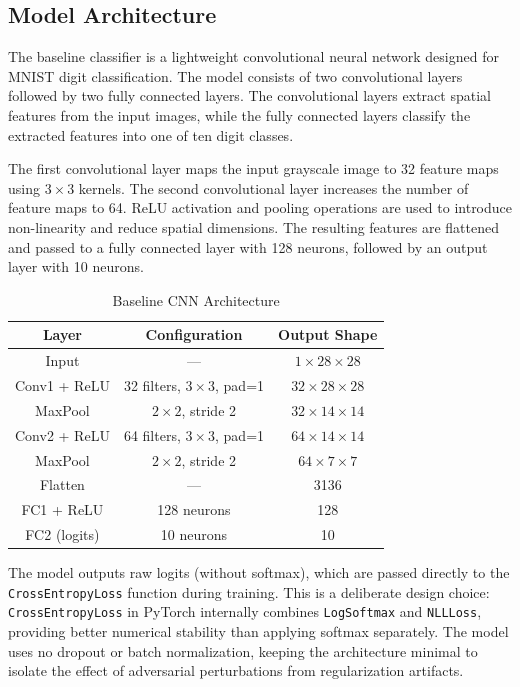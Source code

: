 \documentclass[conference]{IEEEtran}
\begin{document}
\subsection{Model Architecture}

The baseline classifier is a lightweight convolutional neural network designed for MNIST digit classification. The model consists of two convolutional layers followed by two fully connected layers. The convolutional layers extract spatial features from the input images, while the fully connected layers classify the extracted features into one of ten digit classes.

The first convolutional layer maps the input grayscale image to 32 feature maps using $3 \times 3$ kernels. The second convolutional layer increases the number of feature maps to 64. ReLU activation and pooling operations are used to introduce non-linearity and reduce spatial dimensions. The resulting features are flattened and passed to a fully connected layer with 128 neurons, followed by an output layer with 10 neurons.

\begin{table}[htbp]
\caption{Baseline CNN Architecture}
\begin{center}
\begin{tabular}{|c|c|c|}
\hline
\textbf{Layer} & \textbf{Configuration} & \textbf{Output Shape} \\
\hline
Input & --- & $1 \times 28 \times 28$ \\
\hline
Conv1 + ReLU & 32 filters, $3{\times}3$, pad=1 & $32 \times 28 \times 28$ \\
\hline
MaxPool & $2{\times}2$, stride 2 & $32 \times 14 \times 14$ \\
\hline
Conv2 + ReLU & 64 filters, $3{\times}3$, pad=1 & $64 \times 14 \times 14$ \\
\hline
MaxPool & $2{\times}2$, stride 2 & $64 \times 7 \times 7$ \\
\hline
Flatten & --- & 3136 \\
\hline
FC1 + ReLU & 128 neurons & 128 \\
\hline
FC2 (logits) & 10 neurons & 10 \\
\hline
\end{tabular}
\label{tab:model_architecture}
\end{center}
\end{table}

The model outputs raw logits (without softmax), which are passed directly to the \texttt{CrossEntropyLoss} function during training. This is a deliberate design choice: \texttt{CrossEntropyLoss} in PyTorch internally combines \texttt{LogSoftmax} and \texttt{NLLLoss}, providing better numerical stability than applying softmax separately. The model uses no dropout or batch normalization, keeping the architecture minimal to isolate the effect of adversarial perturbations from regularization artifacts.
\end{document}
